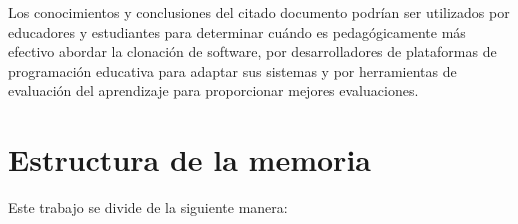 \documentclass[a4paper, 12pt]{book}
\begin{document}
Los conocimientos y conclusiones del citado documento podrían ser utilizados por educadores y estudiantes para determinar cuándo es pedagógicamente más efectivo abordar la clonación de software, por desarrolladores de plataformas de programación educativa para adaptar sus sistemas y por herramientas de evaluación del aprendizaje para proporcionar mejores evaluaciones. 



\section{Estructura de la memoria}
\label{sec:estructura}

Este trabajo se divide de la siguiente manera:
\end{document}
